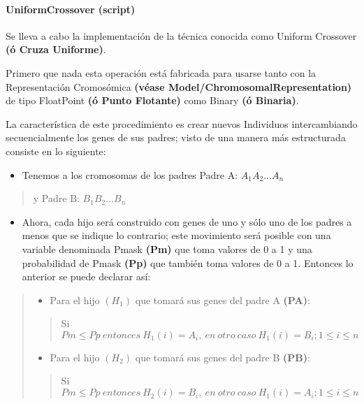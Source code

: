 \documentclass[letterpaper,10pt,english]{sphinxmanual}
\begin{document}
\paragraph{UniformCrossover (script)}
\label{Model/Operator/Crossover/UniformCrossover:uniformcrossover-script}\label{Model/Operator/Crossover/UniformCrossover::doc}
\begin{DUlineblock}{0em}
\item[] Se lleva a cabo la implementación de la técnica conocida como Uniform Crossover
\textbf{(ó Cruza Uniforme)}.
\item[] Primero que nada esta operación está fabricada para usarse tanto con la Representación
Cromosómica \textbf{(véase Model/ChromosomalRepresentation)}
de tipo FloatPoint \textbf{(ó Punto Flotante)} como Binary \textbf{(ó Binaria)}.
\item[] 
\item[] La característica de este procedimiento es crear nuevos Individuos intercambiando
secuencialmente los genes de sus padres; visto de una manera más estructurada consiste en lo siguiente:
\end{DUlineblock}
\begin{itemize}
\item {} 
Tenemos a los cromosomas de los padres Padre A: \(A_1A_2...A_n\)

\end{itemize}
\begin{quote}

y Padre B: \(B_1B_2...B_n\)
\end{quote}
\begin{itemize}
\item {} 
Ahora, cada hijo será construido con genes de uno y sólo uno de los padres a menos que se indique lo contrario; este movimiento será posible con una variable denominada Pmask \textbf{(Pm)} que toma valores de 0 a 1 y una probabilidad de Pmask \textbf{(Pp)} que también toma valores de 0 a 1. Entonces lo anterior se puede declarar así:

\end{itemize}
\begin{quote}
\begin{itemize}
\item {} 
Para el hijo \((H_1)\) que tomará sus genes del padre A \textbf{(PA)}:

\end{itemize}
\begin{quote}

Si \(Pm \leqslant Pp\ entonces\ H_1(i) = A_i,\ en\ otro\ caso\ H_1(i) = B_i; 1 \leqslant i \leqslant n\)
\end{quote}
\begin{itemize}
\item {} 
Para el hijo \((H_2)\) que tomará sus genes del padre B \textbf{(PB)}:

\end{itemize}
\begin{quote}

Si \(Pm \leqslant Pp\ entonces\ H_2(i) = B_i,\ en\ otro\ caso\ H_1(i) = A_i; 1 \leqslant i \leqslant n\)
\end{quote}
\end{quote}
\end{document}
